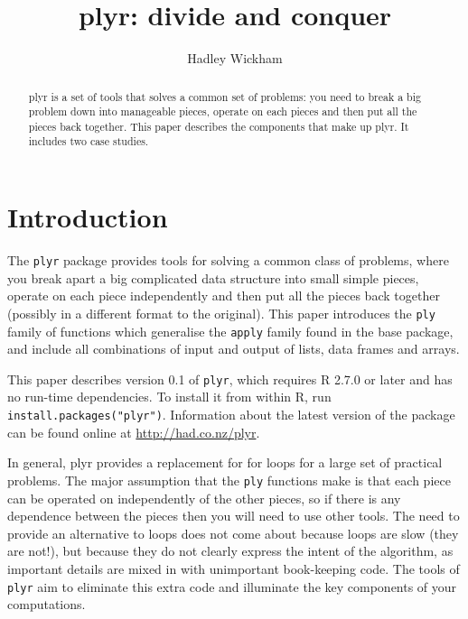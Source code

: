\documentclass[letterpage]{scrartcl}
\title{plyr: divide and conquer}
\author{Hadley Wickham}
\begin{document}
\maketitle

%

\begin{abstract}
plyr is a set of tools that solves a common set of problems: you need to break a big problem down into manageable pieces, operate on each pieces and then put all the pieces back together.  This paper describes the components that make up plyr.  It includes two case studies.
\end{abstract}

\section{Introduction}

The {\tt plyr} package provides tools for solving a common class of problems, where you break apart a big complicated data structure into small simple pieces, operate on each piece independently and then put all the pieces back together (possibly in a different format to the original).  This paper introduces the {\tt ply} family of functions which generalise the {\tt apply} family found in the base package, and include all combinations of input and output of lists, data frames and arrays.

This paper describes version 0.1 of {\tt plyr}, which requires R 2.7.0 or later and has no run-time dependencies.  To install it from within R, run {\tt install.packages("plyr")}.  Information about the latest version of the package can be found online at \url{http://had.co.nz/plyr}.  


In general, plyr provides a replacement for for loops for a large set of practical problems.  The major assumption that the {\tt ply} functions make is that each piece can be operated on independently of the other pieces, so if there is any dependence between the pieces then you will need to use other tools.  The need to provide an alternative to loops does not come about because loops are slow (they are not!), but because they do not clearly express the intent of the algorithm, as important details are mixed in with unimportant book-keeping code. The tools of {\tt plyr} aim to eliminate this extra code and illuminate the key components of your computations.
\end{document}
